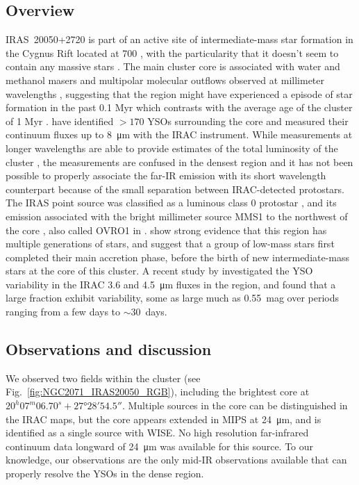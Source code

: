 \subsection{Overview}
IRAS~20050+2720 is part of an active site of intermediate-mass star formation in the Cygnus Rift located at \SI{700}{\pc} \citep{Wilking:1989el}, with the particularity that it doesn't seem to contain any massive stars \citep{Gunther:2012dq}. The main cluster core is associated with water and methanol masers \citep{Palla:1991up,Fontani:2010cf} and multipolar molecular outflows observed at millimeter wavelengths \citep{Bachiller:1995cy,Anglada:1998uu,Beltran:2008gu}, suggesting that the region might have experienced a episode of star formation in the past 0.1 Myr which contrasts with the average age of the cluster of 1 Myr \citep{Chen:1997tb,Gutermuth:2005hx}. \cite{Gutermuth:2009gca} have identified $>170$ YSOs surrounding the core and measured their continuum fluxes up to \SI{8}{\micro\meter} with the \Spitzer IRAC instrument. While measurements at longer wavelengths are able to provide estimates of the total luminosity of the cluster \citep[e.g. using IRAS,][\SI{388}{\Lsun}]{Molinari:1996td}, the measurements are confused in the densest region and it has not been possible to properly associate the far-IR emission with its short wavelength counterpart because of the small separation between IRAC-detected protostars. 
The IRAS point source was classified as a luminous class 0 protostar \citep{Bachiller:1996ja}, and its emission associated with the bright millimeter source MMS1 to the northwest of the core \citep{Chini:2001fa}, also called OVRO1 in \citet{vanKempen:2012fb}. \citet{Beltran:2008gu} show strong evidence that this region has multiple generations of stars, and suggest that a group of low-mass stars first completed their main accretion phase, before the birth of new intermediate-mass stars at the core of this cluster. A recent study by \citet{Poppenhaeger:2015hm} investigated the YSO variability in the IRAC 3.6 and \SI{4.5}{\um} fluxes in the region, and found that a large fraction exhibit variability, some as large much as 0.55~mag over periods ranging from a few days to $\sim 30$~days. 


\subsection{Observations and discussion}

We observed two fields within the cluster (see Fig.~\ref{fig:NGC2071_IRAS20050_RGB}), including the brightest core at $20^h 07^m 06.70^s +\ang{27;28;54.5}$. Multiple sources in the core can be distinguished in the IRAC maps, but the core appears extended in \Spitzer MIPS at \SI{24}{\micro\meter}, and is identified as a single source with WISE. No high resolution far-infrared continuum data longward of \SI{24}{\micro\meter} was available for this source. To our knowledge, our observations are the only mid-IR observations available that can properly resolve the YSOs in the dense region. 

